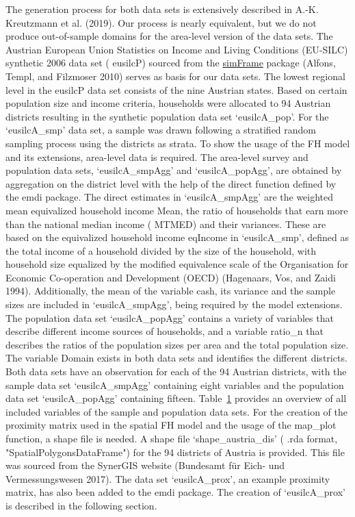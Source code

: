 The generation process for both data sets is extensively described in
A.-K. Kreutzmann et al. (2019). Our process is nearly equivalent, but we do not produce
out-of-sample domains for the area-level version of the data sets. The
Austrian European Union Statistics on Income and Living Conditions
(EU-SILC) synthetic 2006 data set ( eusilcP) sourced from the
\href{https://CRAN.R-project.org/package=simFrame}{simFrame} package
(Alfons, Templ, and Filzmoser 2010) serves as basis for our data sets. The lowest
regional level in the eusilcP data set consists of the nine Austrian
states. Based on certain population size and income criteria, households
were allocated to 94 Austrian districts resulting in the synthetic
population data set `{eusilcA\_pop}'. For the
`{eusilcA\_smp}' data set, a sample was drawn following a
stratified random sampling process using the districts as strata. To
show the usage of the FH model and its extensions, area-level data is
required. The area-level survey and population data sets,
`{eusilcA\_smpAgg}' and `{eusilcA\_popAgg}', are
obtained by aggregation on the district level with the help of the
direct function defined by the emdi package. The direct estimates in
`{eusilcA\_smpAgg}' are the weighted mean equivalized
household income Mean, the ratio of households that earn more than the
national median income ( MTMED) and their variances. These are based on
the equivalized household income eqIncome in
`{eusilcA\_smp}', defined as the total income of a household
divided by the size of the household, with household size equalized by
the modified equivalence scale of the Organisation for Economic
Co-operation and Development (OECD) (Hagenaars, Vos, and Zaidi 1994). Additionally, the
mean of the variable cash, its variance and the sample sizes are
included in `{eusilcA\_smpAgg}', being required by the model
extensions. The population data set `{eusilcA\_popAgg}'
contains a variety of variables that describe different income sources
of households, and a variable ratio\_n that describes the ratios of the
population sizes per area and the total population size. The variable
Domain exists in both data sets and identifies the different districts.
Both data sets have an observation for each of the 94 Austrian
districts, with the sample data set `{eusilcA\_smpAgg}'
containing eight variables and the population data set
`{eusilcA\_popAgg}' containing fifteen.
Table~\protect\hyperlink{tab:variables}{1} provides an overview of all included
variables of the sample and population data sets. For the creation of
the proximity matrix used in the spatial FH model and the usage of the
map\_plot function, a shape file is needed. A shape file
`{shape\_austria\_dis}' ( .rda format,
"SpatialPolygonsDataFrame") for the 94 districts of Austria is
provided. This file was sourced from the SynerGIS website
(Bundesamt für Eich- und Vermessungswesen 2017). The data set `{eusilcA\_prox}', an example
proximity matrix, has also been added to the emdi package. The creation
of `{eusilcA\_prox}' is described in the following section.


